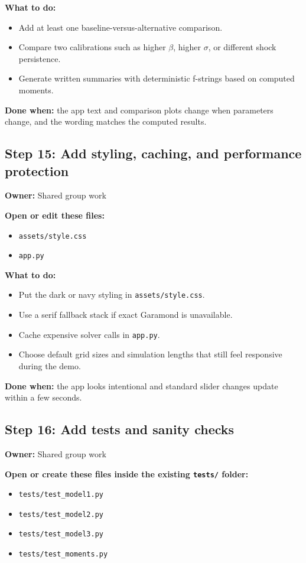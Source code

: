 \documentclass[11pt]{article}
\begin{document}
\textbf{What to do:}
\begin{itemize}
    \item Add at least one baseline-versus-alternative comparison.
    \item Compare two calibrations such as higher \(\beta\), higher \(\sigma\), or different shock persistence.
    \item Generate written summaries with deterministic f-strings based on computed moments.
\end{itemize}

\textbf{Done when:} the app text and comparison plots change when parameters change, and the wording matches the computed results.

\subsection{Step 15: Add styling, caching, and performance protection}
\textbf{Owner:} Shared group work

\textbf{Open or edit these files:}
\begin{itemize}
    \item \texttt{assets/style.css}
    \item \texttt{app.py}
\end{itemize}

\textbf{What to do:}
\begin{itemize}
    \item Put the dark or navy styling in \texttt{assets/style.css}.
    \item Use a serif fallback stack if exact Garamond is unavailable.
    \item Cache expensive solver calls in \texttt{app.py}.
    \item Choose default grid sizes and simulation lengths that still feel responsive during the demo.
\end{itemize}

\textbf{Done when:} the app looks intentional and standard slider changes update within a few seconds.

\subsection{Step 16: Add tests and sanity checks}
\textbf{Owner:} Shared group work

\textbf{Open or create these files inside the existing \texttt{tests/} folder:}
\begin{itemize}
    \item \texttt{tests/test\_model1.py}
    \item \texttt{tests/test\_model2.py}
    \item \texttt{tests/test\_model3.py}
    \item \texttt{tests/test\_moments.py}
\end{itemize}
\end{document}
